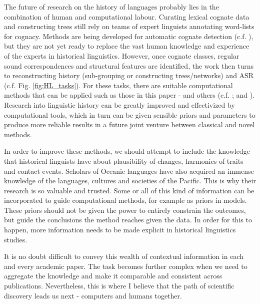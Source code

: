 \documentclass[12pt,letterpaper]{article}
\begin{document}


The future of research on the history of languages probably lies in the combination of human and computational labour. Curating lexical cognate data \citep{list2022lexibank} and constructing trees \citep{grayetal_2009} still rely on teams of expert linguists annotating word-lists for cognacy. Methods are being developed for automatic cognate detection (c.f. \citet{list2017potential}), but they are not yet ready to replace the vast human knowledge and experience of the experts in historical linguistics. However, once cognate classes, regular sound correspondences and structural features are identified, the work then turns to reconstructing history (sub-grouping or constructing trees/networks) and ASR (c.f. Fig. \ref{fig:HL_tasks}). For these tasks, there are suitable computational methods that can be applied such as those in this paper - and others (c.f. \citet{greenhill2015evolution}; \citet{gray_greenhill_defend_bayes} and \citet{joy2016ancestral}). Research into linguistic history can be greatly improved and effectivized by computational tools, which in turn can be given sensible priors and parameters to produce more reliable results in a future joint venture between classical and novel methods.

In order to improve these methods, we should attempt to include the knowledge that historical linguists have about plausibility of changes, harmonics of traits and contact events. Scholars of Oceanic languages have also acquired an immense knowledge of the languages, cultures and societies of the Pacific. This is why their research is so valuable and trusted. Some or all of this kind of information can be incorporated to guide computational methods, for example as priors in models. These priors should not be given the power to entirely constrain the outcomes, but guide the conclusions the method reaches given the data. In order for this to happen, more information needs to be made explicit in historical linguistics studies.

It is no doubt difficult to convey this wealth of contextual information in each and every academic paper. The task becomes further complex when we need to aggregate the knowledge and make it comparable and consistent across publications. Nevertheless, this is where I believe that the path of scientific discovery leads us next - computers and humans together.
\end{document}
